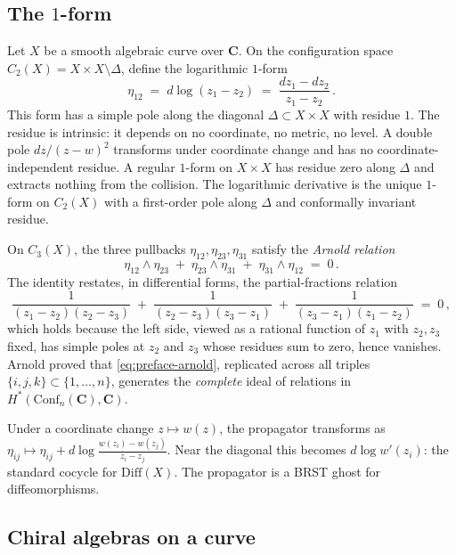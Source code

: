 \documentclass[11pt]{report}
\theoremstyle{definition}
\theoremstyle{remark}
\numberwithin{equation}{section}
\begin{document}
\subsection*{The $1$-form}

\noindent
Let $X$ be a smooth algebraic curve over $\mathbf{C}$. On the configuration space
$C_2(X) = X \times X \setminus \Delta$, define the logarithmic $1$-form
\begin{equation}\label{eq:preface-eta}
\eta_{12} \;=\; d\log(z_1 - z_2) \;=\; \frac{dz_1 - dz_2}{z_1 - z_2}\,.
\end{equation}
This form has a simple pole along the diagonal $\Delta \subset X \times X$
with residue $1$. The residue is intrinsic: it depends on no coordinate, no
metric, no level. A double pole $dz/(z-w)^2$ transforms under coordinate
change and has no coordinate-independent residue. A regular $1$-form on
$X \times X$ has residue zero along $\Delta$ and extracts nothing from the
collision. The logarithmic derivative is the unique $1$-form on $C_2(X)$
with a first-order pole along $\Delta$ and conformally invariant residue.

On $C_3(X)$, the three pullbacks $\eta_{12}, \eta_{23}, \eta_{31}$ satisfy
the \emph{Arnold relation}
\begin{equation}\label{eq:preface-arnold}
\eta_{12} \wedge \eta_{23} \;+\; \eta_{23} \wedge \eta_{31}
\;+\; \eta_{31} \wedge \eta_{12} \;=\; 0\,.
\end{equation}
The identity restates, in differential forms, the partial-fractions relation
\[
\frac{1}{(z_1 - z_2)(z_2 - z_3)}
\;+\; \frac{1}{(z_2 - z_3)(z_3 - z_1)}
\;+\; \frac{1}{(z_3 - z_1)(z_1 - z_2)}
\;=\; 0\,,
\]
which holds because the left side, viewed as a rational function of $z_1$
with $z_2, z_3$ fixed, has simple poles at $z_2$ and $z_3$ whose residues
sum to zero, hence vanishes. Arnold proved that
\eqref{eq:preface-arnold}, replicated across all triples
$\{i,j,k\} \subset \{1, \ldots, n\}$, generates the \emph{complete} ideal
of relations in $H^*(\mathrm{Conf}_n(\mathbf{C}), \mathbf{C})$.

Under a coordinate change $z \mapsto w(z)$, the propagator transforms as
$\eta_{ij} \mapsto \eta_{ij} + d\log\frac{w(z_i) - w(z_j)}{z_i - z_j}$.
Near the diagonal this becomes $d\log w'(z_i)$: the standard cocycle for
$\mathrm{Diff}(X)$. The propagator is a BRST ghost for diffeomorphisms.

\subsection*{Chiral algebras on a curve}
\end{document}
